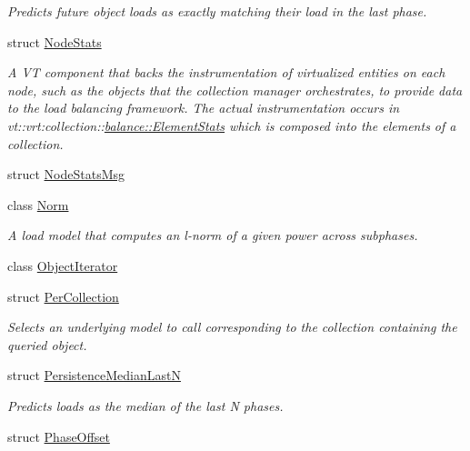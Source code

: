 \begin{DoxyCompactItemize}
\begin{DoxyCompactList}\small\item\em Predicts future object loads as exactly matching their load in the last phase. \end{DoxyCompactList}\item 
struct \hyperlink{structvt_1_1vrt_1_1collection_1_1balance_1_1_node_stats}{Node\+Stats}
\begin{DoxyCompactList}\small\item\em A VT component that backs the instrumentation of virtualized entities on each node, such as the objects that the collection manager orchestrates, to provide data to the load balancing framework. The actual instrumentation occurs in {\ttfamily vt\+::vrt\+:collection\+:}\+:\hyperlink{structvt_1_1vrt_1_1collection_1_1balance_1_1_element_stats}{balance\+::\+Element\+Stats} which is composed into the elements of a collection. \end{DoxyCompactList}\item 
struct \hyperlink{structvt_1_1vrt_1_1collection_1_1balance_1_1_node_stats_msg}{Node\+Stats\+Msg}
\item 
class \hyperlink{classvt_1_1vrt_1_1collection_1_1balance_1_1_norm}{Norm}
\begin{DoxyCompactList}\small\item\em A load model that computes an l-\/norm of a given power across subphases. \end{DoxyCompactList}\item 
class \hyperlink{classvt_1_1vrt_1_1collection_1_1balance_1_1_object_iterator}{Object\+Iterator}
\item 
struct \hyperlink{structvt_1_1vrt_1_1collection_1_1balance_1_1_per_collection}{Per\+Collection}
\begin{DoxyCompactList}\small\item\em Selects an underlying model to call corresponding to the collection containing the queried object. \end{DoxyCompactList}\item 
struct \hyperlink{structvt_1_1vrt_1_1collection_1_1balance_1_1_persistence_median_last_n}{Persistence\+Median\+LastN}
\begin{DoxyCompactList}\small\item\em Predicts loads as the median of the last N phases. \end{DoxyCompactList}\item 
struct \hyperlink{structvt_1_1vrt_1_1collection_1_1balance_1_1_phase_offset}{Phase\+Offset}

\end{DoxyCompactItemize}
